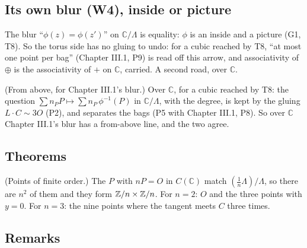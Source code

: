 \subsection*{Its own blur (W4), inside or picture}

\begin{lines}
\item[\lab{P5}] The blur ``$\phi(z) = \phi(z')$'' on $\mathbb{C}/\Lambda$ is equality: $\phi$ is an inside and a picture (G1, T8). So the torus side has no gluing to undo: for a cubic reached by T8, ``at most one point per bag'' (Chapter III.1, P9) is read off this arrow, and associativity of $\oplus$ is the associativity of $+$ on $\mathbb{C}$, carried. A second road, over $\mathbb{C}$.
\item[\lab{P6}] (From above, for Chapter III.1's blur.) Over $\mathbb{C}$, for a cubic reached by T8: the question $\sum n_P P \mapsto \sum n_P\, \phi^{-1}(P)$ in $\mathbb{C}/\Lambda$, with the degree, is kept by the gluing $L \cdot C \sim 3O$ (P2), and separates the bags (P5 with Chapter III.1, P8). So over $\mathbb{C}$ Chapter III.1's blur has a from-above line, and the two agree.
\end{lines}

\subsection*{Theorems}

\begin{lines}
\item[\lab{T1}] (Points of finite order.) The $P$ with $nP = O$ in $C(\mathbb{C})$ match $(\tfrac1n \Lambda)/\Lambda$, so there are $n^2$ of them and they form $\mathbb{Z}/n \times \mathbb{Z}/n$. For $n = 2$: $O$ and the three points with $y = 0$. For $n = 3$: the nine points where the tangent meets $C$ three times.
\end{lines}

\subsection*{Remarks}

